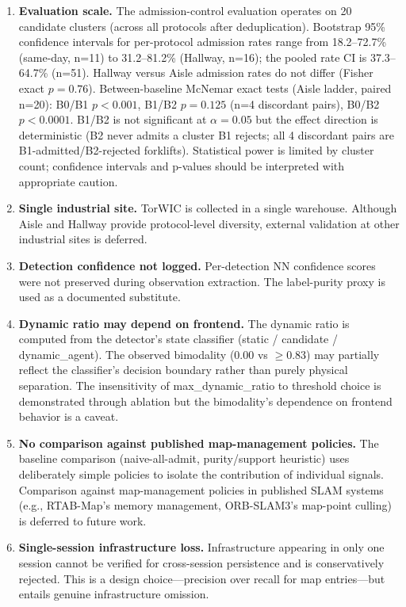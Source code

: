 \documentclass[journal]{IEEEtran}
\begin{document}
\begin{enumerate}
  \item \textbf{Evaluation scale.} The admission-control evaluation operates on 20 candidate clusters (across all protocols after deduplication). Bootstrap 95\% confidence intervals for per-protocol admission rates range from 18.2--72.7\% (same-day, n=11) to 31.2--81.2\% (Hallway, n=16); the pooled rate CI is 37.3--64.7\% (n=51). Hallway versus Aisle admission rates do not differ (Fisher exact $p=0.76$). Between-baseline McNemar exact tests (Aisle ladder, paired n=20): B0/B1 $p{<}0.001$, B1/B2 $p{=}0.125$ (n=4 discordant pairs), B0/B2 $p{<}0.0001$. B1/B2 is not significant at $\alpha{=}0.05$ but the effect direction is deterministic (B2 never admits a cluster B1 rejects; all 4 discordant pairs are B1-admitted/B2-rejected forklifts). Statistical power is limited by cluster count; confidence intervals and p-values should be interpreted with appropriate caution.
  \item \textbf{Single industrial site.} TorWIC is collected in a single warehouse. Although Aisle and Hallway provide protocol-level diversity, external validation at other industrial sites is deferred.
  \item \textbf{Detection confidence not logged.} Per-detection NN confidence scores were not preserved during observation extraction. The label-purity proxy is used as a documented substitute.
  \item \textbf{Dynamic ratio may depend on frontend.} The dynamic ratio is computed from the detector's state classifier (static / candidate / dynamic\_agent). The observed bimodality (0.00 vs $\geq$0.83) may partially reflect the classifier's decision boundary rather than purely physical separation. The insensitivity of max\_dynamic\_ratio to threshold choice is demonstrated through ablation but the bimodality's dependence on frontend behavior is a caveat.
  \item \textbf{No comparison against published map-management policies.} The baseline comparison (naive-all-admit, purity/support heuristic) uses deliberately simple policies to isolate the contribution of individual signals. Comparison against map-management policies in published SLAM systems (e.g., RTAB-Map's memory management, ORB-SLAM3's map-point culling) is deferred to future work.
  \item \textbf{Single-session infrastructure loss.} Infrastructure appearing in only one session cannot be verified for cross-session persistence and is conservatively rejected. This is a design choice---precision over recall for map entries---but entails genuine infrastructure omission.

\end{enumerate}
\end{document}
